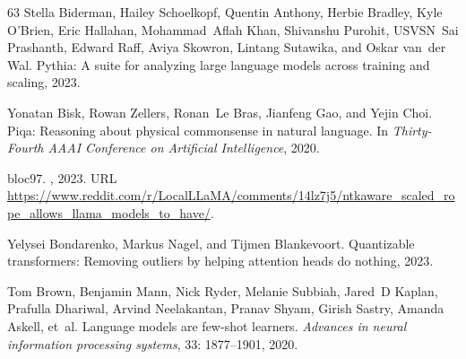 \documentclass{article} \usepackage{iclr2024_conference,times}
\begin{document}
\begin{thebibliography}{63}
Stella Biderman, Hailey Schoelkopf, Quentin Anthony, Herbie Bradley, Kyle
  O'Brien, Eric Hallahan, Mohammad~Aflah Khan, Shivanshu Purohit, USVSN~Sai
  Prashanth, Edward Raff, Aviya Skowron, Lintang Sutawika, and Oskar van~der
  Wal.
\newblock Pythia: A suite for analyzing large language models across training
  and scaling, 2023.

Yonatan Bisk, Rowan Zellers, Ronan~Le Bras, Jianfeng Gao, and Yejin Choi.
\newblock Piqa: Reasoning about physical commonsense in natural language.
\newblock In \emph{Thirty-Fourth AAAI Conference on Artificial Intelligence},
  2020.

bloc97.
,
  2023.
\newblock URL
  \url{https://www.reddit.com/r/LocalLLaMA/comments/14lz7j5/ntkaware_scaled_rope_allows_llama_models_to_have/}.

Yelysei Bondarenko, Markus Nagel, and Tijmen Blankevoort.
\newblock Quantizable transformers: Removing outliers by helping attention
  heads do nothing, 2023.

Tom Brown, Benjamin Mann, Nick Ryder, Melanie Subbiah, Jared~D Kaplan, Prafulla
  Dhariwal, Arvind Neelakantan, Pranav Shyam, Girish Sastry, Amanda Askell,
  et~al.
\newblock Language models are few-shot learners.
\newblock \emph{Advances in neural information processing systems},
  33: 1877--1901, 2020.


\end{thebibliography}
\end{document}
